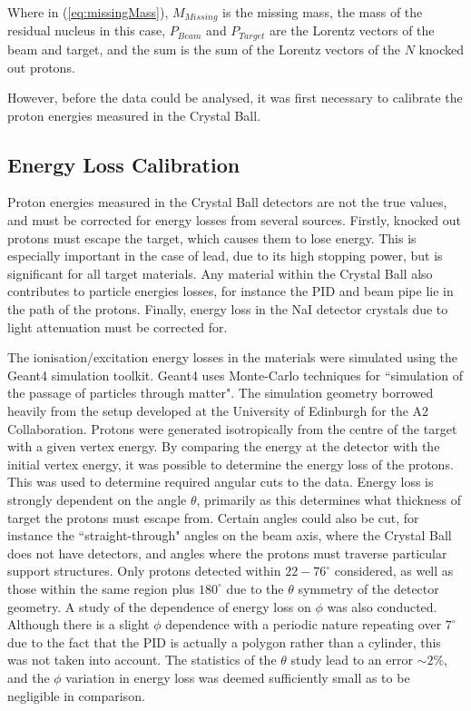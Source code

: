 \documentclass[a4paper,12pt]{article}
\begin{document}
Where in (\ref{eq:missingMass}), $M_{Missing}$ is the missing mass, the mass of the residual nucleus in this case, $P_{Beam}$ and $P_{Target}$ are the Lorentz vectors of the beam and target, and the sum is the sum of the Lorentz vectors of the $N$ knocked out protons.

However, before the data could be analysed, it was first necessary to calibrate the proton energies measured in the Crystal Ball.

\subsection{Energy Loss Calibration}
Proton energies measured in the Crystal Ball detectors are not the true values, and must be corrected for energy losses from several sources. Firstly, knocked out protons must escape the target, which causes them to lose energy. This is especially important in the case of lead, due to its high stopping power, but is significant for all target materials. Any material within the Crystal Ball also contributes to particle energies losses, for instance the PID and beam pipe lie in the path of the protons. Finally, energy loss in the NaI detector crystals due to light attenuation must be corrected for. 

The ionisation/excitation energy losses in the materials were simulated using the Geant4 simulation toolkit. Geant4 uses Monte-Carlo techniques for ``simulation of the passage of particles through matter"\cite{geant4}{}. The simulation geometry borrowed heavily from the setup developed at the University of Edinburgh for the A2 Collaboration\cite{lorenzo}{}. Protons were generated isotropically from the centre of the target with a given vertex energy. By comparing the energy at the detector with the initial vertex energy, it was possible to determine the energy loss of the protons. This was used to determine required angular cuts to the data. Energy loss is strongly dependent on the angle $\theta$, primarily as this determines what thickness of target the protons must escape from. Certain angles could also be cut, for instance the ``straight-through" angles on the beam axis, where the Crystal Ball does not have detectors, and angles where the protons must traverse particular support structures. Only protons detected within $22-76^{\circ}$ considered, as well as those within the same region plus $180^{\circ}$ due to the $\theta$ symmetry of the detector geometry. A study of the dependence of energy loss on $\phi$ was also conducted. Although there is a slight $\phi$ dependence with a periodic nature repeating over $7^{\circ}$ due to the fact that the PID is actually a polygon rather than a cylinder, this was not taken into account. The statistics of the $\theta$ study lead to an error $\sim 2\%$, and the $\phi$ variation in energy loss was deemed sufficiently small as to be negligible in comparison.
\end{document}
